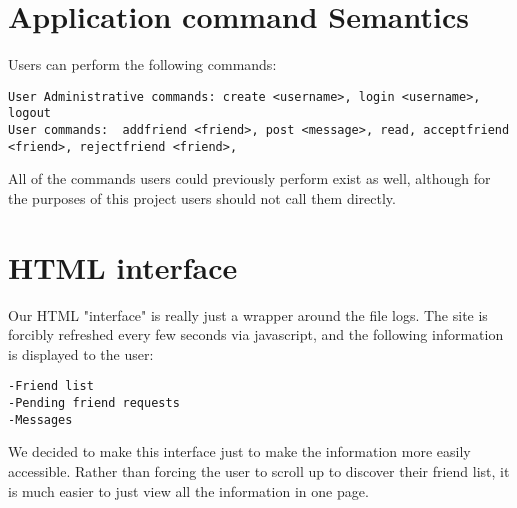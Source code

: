 \documentclass[11pt]{article}
\begin{document}
\section{Application command Semantics}

Users can perform the following commands:
\begin{verbatim}
User Administrative commands: create <username>, login <username>, logout
User commands:  addfriend <friend>, post <message>, read, acceptfriend <friend>, rejectfriend <friend>,
\end{verbatim}

All of the commands users could previously perform exist as well, although for the purposes of this project users should not call them directly.

\section{HTML interface}

Our HTML "interface" is really just a wrapper around the file logs. The site is forcibly refreshed every few seconds via javascript, and the following information is displayed to the user:

\begin{verbatim}
-Friend list
-Pending friend requests
-Messages
\end{verbatim}

We decided to make this interface just to make the information more easily accessible. Rather than forcing the user to scroll up to discover their friend list, it is much easier to just view all the information in one page. 
\end{document}
